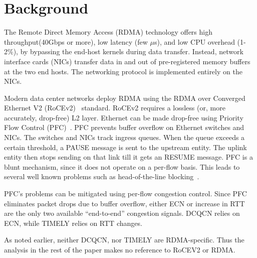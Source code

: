 \section{Background}
The Remote Direct Memory Access (RDMA) technology offers high throughput(40Gbps
or more), low latency (few $\mu$s), and low CPU overhead (1-2\%), by bypassing
the end-host kernels during data transfer. Instead, network interface cards
(NICs) transfer data in and out of pre-registered memory buffers at the two end
hosts. The networking protocol is implemented entirely on the NICs.

Modern data center networks deploy RDMA using the RDMA over Converged Ethernet
V2 (RoCEv2)~\cite{rocev2} standard.  RoCEv2 requires a lossless (or, more
accurately, drop-free) L2 layer. Ethernet can be made drop-free using Priority
Flow Control (PFC)~\cite{pfc}. PFC prevents buffer overflow on Ethernet switches
and NICs. The switches and NICs track ingress queues. When the queue exceeds a
certain threshold, a PAUSE message is sent to the upstream entity. The uplink
entity then stops sending on that link till it gets an RESUME message.  PFC is a
blunt mechanism, since it does not operate on a per-flow basis. This leads to
several well known problems such as head-of-the-line
blocking~\cite{dcqcn,tcp-bolt}. 

PFC's problems can be mitigated using per-flow congestion control. Since PFC
eliminates packet drops due to buffer overflow, either ECN or increase in RTT
are the only two available ``end-to-end'' congestion signals.  DCQCN relies on
ECN, while TIMELY relies on RTT changes.

As noted earlier, neither DCQCN, nor TIMELY are RDMA-specific. Thus the analysis
in the rest of the paper makes no reference to RoCEV2 or RDMA.

